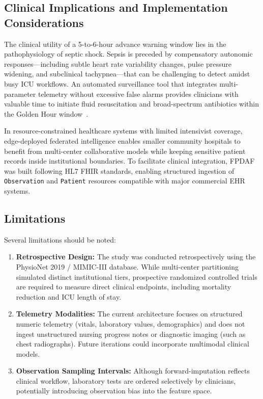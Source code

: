 \documentclass[11pt,a4paper]{article}
\begin{document}
\subsection{Clinical Implications and Implementation Considerations}
The clinical utility of a 5-to-6-hour advance warning window lies in the pathophysiology of septic shock. Sepsis is preceded by compensatory autonomic responses---including subtle heart rate variability changes, pulse pressure widening, and subclinical tachypnea---that can be challenging to detect amidst busy ICU workflows. An automated surveillance tool that integrates multi-parameter telemetry without excessive false alarms provides clinicians with valuable time to initiate fluid resuscitation and broad-spectrum antibiotics within the Golden Hour window~\cite{evans2021surviving,dusing2025sepsis}.

In resource-constrained healthcare systems with limited intensivist coverage, edge-deployed federated intelligence enables smaller community hospitals to benefit from multi-center collaborative models while keeping sensitive patient records inside institutional boundaries. To facilitate clinical integration, FPDAF was built following HL7 FHIR standards, enabling structured ingestion of \texttt{Observation} and \texttt{Patient} resources compatible with major commercial EHR systems.

\subsection{Limitations}
Several limitations should be noted:
\begin{enumerate}[leftmargin=*]
    \item \textbf{Retrospective Design:} The study was conducted retrospectively using the PhysioNet 2019 / MIMIC-III database. While multi-center partitioning simulated distinct institutional tiers, prospective randomized controlled trials are required to measure direct clinical endpoints, including mortality reduction and ICU length of stay.
    \item \textbf{Telemetry Modalities:} The current architecture focuses on structured numeric telemetry (vitals, laboratory values, demographics) and does not ingest unstructured nursing progress notes or diagnostic imaging (such as chest radiographs). Future iterations could incorporate multimodal clinical models.
    \item \textbf{Observation Sampling Intervals:} Although forward-imputation reflects clinical workflow, laboratory tests are ordered selectively by clinicians, potentially introducing observation bias into the feature space.
\end{enumerate}
\end{document}
